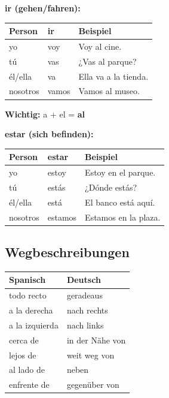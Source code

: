 \documentclass[11pt,a4paper]{article}
\begin{document}
\textbf{ir (gehen/fahren):}
\begin{center}
\begin{tabular}{|l|l|l|}
\hline
\textbf{Person} & \textbf{ir} & \textbf{Beispiel} \\
\hline
yo & voy & Voy al cine. \\
\hline
tú & vas & ¿Vas al parque? \\
\hline
él/ella & va & Ella va a la tienda. \\
\hline
nosotros & vamos & Vamos al museo. \\
\hline
\end{tabular}
\end{center}

\textbf{Wichtig:} a + el = \textbf{al}

\vspace{1em}

\textbf{estar (sich befinden):}
\begin{center}
\begin{tabular}{|l|l|l|}
\hline
\textbf{Person} & \textbf{estar} & \textbf{Beispiel} \\
\hline
yo & estoy & Estoy en el parque. \\
\hline
tú & estás & ¿Dónde estás? \\
\hline
él/ella & está & El banco está aquí. \\
\hline
nosotros & estamos & Estamos en la plaza. \\
\hline
\end{tabular}
\end{center}

\subsection{Wegbeschreibungen}
\begin{center}
\begin{tabular}{|l|l|}
\hline
\textbf{Spanisch} & \textbf{Deutsch} \\
\hline
todo recto & geradeaus \\
\hline
a la derecha & nach rechts \\
\hline
a la izquierda & nach links \\
\hline
cerca de & in der Nähe von \\
\hline
lejos de & weit weg von \\
\hline
al lado de & neben \\
\hline
enfrente de & gegenüber von \\
\hline
\end{tabular}
\end{center}
\end{document}
